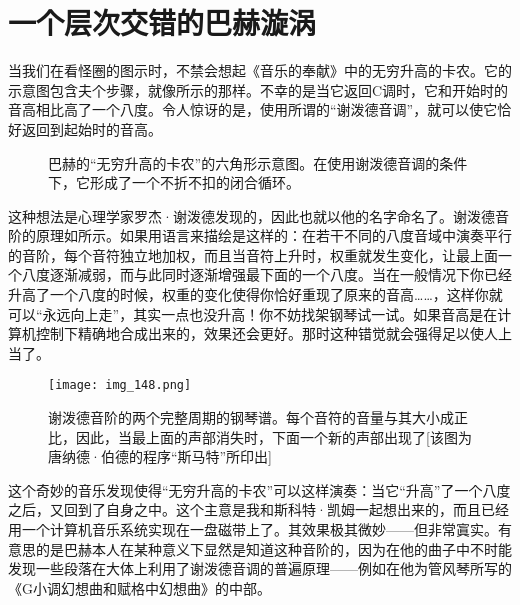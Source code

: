 \section{一个层次交错的巴赫漩涡}

当我们在看怪圈的图示时，不禁会想起《音乐的奉献》中的无穷升高的卡农。它的示意图包含夫个步骤，就像所示的那样。不幸的是当它返回C调时，它和开始时的音高相比高了一个八度。令人惊讶的是，使用所谓的“谢泼德音调”，就可以使它恰好返回到起始时的音高。

\begin{figure}
\caption[用谢泼德音调演奏的巴赫“无穷升高的卡农”形成了一个怪圈。]
  {巴赫的“无穷升高的卡农”的六角形示意图。在使用谢泼德音调的条件下，它形成了一个不折不扣的闭合循环。}
\end{figure}

这种想法是心理学家罗杰·谢泼德发现的，因此也就以他的名字命名了。谢泼德音阶的原理如所示。如果用语言来描绘是这样的：在若干不同的八度音域中演奏平行的音阶，每个音符独立地加权，而且当音符上升时，权重就发生变化，让最上面一个八度逐渐减弱，而与此同时逐渐增强最下面的一个八度。当在一般情况下你已经升高了一个八度的时候，权重的变化使得你恰好重现了原来的音高……，这样你就可以“永远向上走”，其实一点也没升高！你不妨找架钢琴试一试。如果音高是在计算机控制下精确地合成出来的，效果还会更好。那时这种错觉就会强得足以使人上当了。

\begin{sidewaysfigure}
\texttt{[image: img\_148.png]}
\caption[谢泼德音阶的两个完整周期的钢琴谱。]
  {谢泼德音阶的两个完整周期的钢琴谱。每个音符的音量与其大小成正比，因此，当最上面的声部消失时，下面一个新的声部出现了[该图为唐纳德·伯德的程序“斯马特”所印出] }
\end{sidewaysfigure}

这个奇妙的音乐发现使得“无穷升高的卡农”可以这样演奏：当它“升高”了一个八度之后，又回到了自身之中。这个主意是我和斯科特·凯姆一起想出来的，而且已经用一个计算机音乐系统实现在一盘磁带上了。其效果极其微妙——但非常寘实。有意思的是巴赫本人在某种意义下显然是知道这种音阶的，因为在他的曲子中不时能发现一些段落在大体上利用了谢泼德音调的普遍原理——例如在他为管风琴所写的《G小调幻想曲和赋格中幻想曲》的中部。

